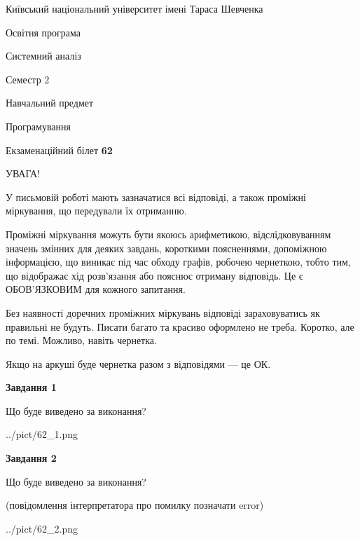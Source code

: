 \documentclass[12pt, ukrainian]{article}
\begin{document}
{{\begin {small}\par
{ \center  Київський національний університет імені Тараса Шевченка \par}
{\parbox {5 cm}{Освітня програма \hfill}{\parbox {7 cm}{Системний аналіз \hfill}}\parbox {6 cm}{\hfill Семестр 2}}\par
{\parbox {5 cm} {Навчальний предмет \hfill}\parbox {7 cm}{Програмування \hfill}\parbox {6cm}{\hfill}\par}\vspace{-7pt} \end{small}}{\center Екзаменаційний білет \No \textbf
{ 62 }\par}}
{
\begin {large}
УВАГА!

У письмовій роботі мають зазначатися всі відповіді, а також проміжні міркування, що передували їх отриманню.

Проміжні міркування можуть бути якоюсь арифметикою, відслідковуванням зна\-чень змінних для деяких завдань,
короткими поясненнями, допоміжною інформацією, що виникає під час обходу графів, робочею чернеткою,
тобто тим, що відображає хід розв’язання або пояснює отриману відповідь.
Це є ОБОВ’ЯЗКОВИМ для кожного запитання.

Без наявності доречних проміжних міркувань відповіді зараховуватись як правиль\-ні не будуть.
Писати багато та красиво оформлено не треба. Коротко, але по темі. Можли\-во, навіть чернетка.

Якщо на аркуші буде чернетка разом з відповідями --- це ОК.

\newpage

{\begin {center}\textbf{Завдання 1}\end {center}}\par
Що буде виведено за виконання?\par
\begin{center}
	{../pict/62_1.png}
\end{center}
\newpage

{\begin {center}\textbf{Завдання 2}\end {center}}\par
Що буде виведено за виконання?\par
 (повідомлення інтерпретатора про помилку позначати error)\par
\begin{center}
	{../pict/62_2.png}
\end{center}
\newpage


\end{large}}
\end{document}
